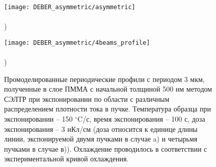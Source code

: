 \begin{figure}[h]
	\begin{minipage}{0.48\textwidth}
		\texttt{[image: DEBER\_asymmetric/asymmetric]} \\
		\vspace{-13em} \\ ) \\ \vspace{13em}
	\end{minipage}
	\begin{minipage}{0.48\textwidth}
		\texttt{[image: DEBER\_asymmetric/4beams\_profile]} \\
		\vspace{-13em} \\ ) \\ \vspace{13em}
	\end{minipage}
	\vspace{-3em}
	\caption{Промоделированные периодические профили с периодом 3 мкм, полученные в слое ПММА с начальной толщиной 500 нм методом СЭЛТР при экспонировании по области с различным распределением плотности тока в пучке. Температура образца при экспонировании -- 150 $^\circ$C/с, время экспонирования -- 100 с, доза экспонирования -- 3 нКл/см (доза относится к единице длины линии, экспонируемой двумя пучками в случае a) и четырьмя пучками в случае в)). Охлаждение проводилось в соответствии с экспериментальной кривой охлаждения.}
	\label{fig:DEBER_multibeam}
\end{figure}
